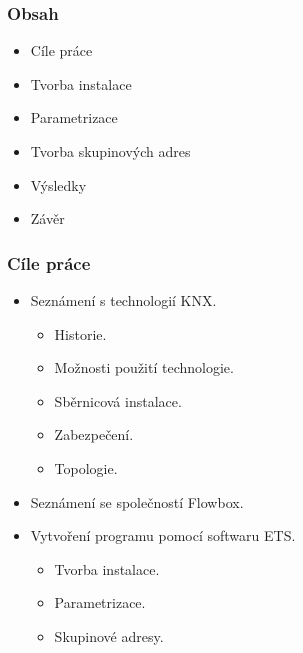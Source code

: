 \documentclass[%
  12pt,       				%
	t,                  %
	aspectratio=1610,   %
	unicode,						%
]{beamer}				    	%
\begin{document}
\disablenavigationsymbols

\maketitle

\begin{frame} 
	\frametitle{Obsah}
	\begin{itemize}
			\item Cíle práce
			\item Tvorba instalace
			\item Parametrizace
			\item Tvorba skupinových adres
			\item Výsledky
			\item Závěr
	\end{itemize}
\end{frame}

\begin{frame} 
	\frametitle{Cíle práce}
	\begin{itemize}
			\item Seznámení s technologií KNX.
			    \begin{itemize}
					\item Historie.
					\item Možnosti použití technologie.
					\item Sběrnicová instalace.
					\item Zabezpečení.
					\item Topologie.
				\end{itemize}
			\item Seznámení se společností Flowbox.
			\item Vytvoření programu pomocí softwaru ETS.
				\begin{itemize}
					\item Tvorba instalace.
					\item Parametrizace.
					\item Skupinové adresy.
				\end{itemize}
	\end{itemize}
\end{frame}
\end{document}
